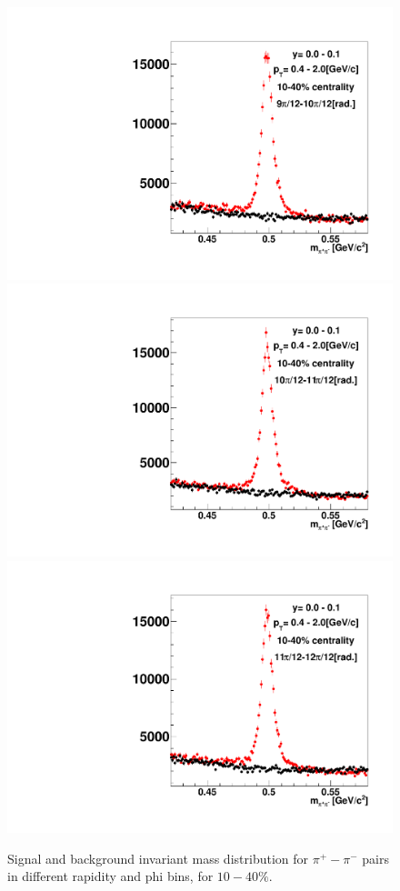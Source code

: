 \begin{figure}[h]
\includegraphics[width=0.14\linewidth]{chapterX/fig/ks_v1_sig/kf_ptslice0_cent1_ks_flow_phi10_rap4_check.pdf}
\includegraphics[width=0.14\linewidth]{chapterX/fig/ks_v1_sig/kf_ptslice0_cent1_ks_flow_phi11_rap4_check.pdf}
\includegraphics[width=0.14\linewidth]{chapterX/fig/ks_v1_sig/kf_ptslice0_cent1_ks_flow_phi12_rap4_check.pdf}

\caption{Signal and background invariant mass distribution for $\pi^{+}-\pi^{-}$ pairs in different rapidity and phi bins, for $10-40\%$.}
\label{ks_v1_sig_raw}
\end{figure}

